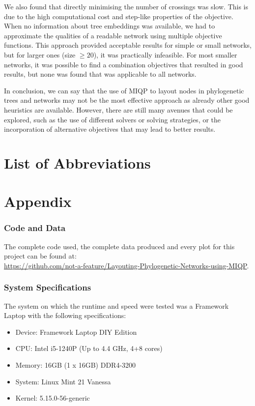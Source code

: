 \documentclass{article}
\begin{document}
We also found that directly minimising the number of crossings was slow. This is due to the high computational cost and step-like properties of the objective. When no information about tree embeddings was available, we had to approximate the qualities of a readable network using multiple objective functions. This approach provided acceptable results for simple or small networks, but for larger ones (size $\geq 20$), it was practically infeasible. For most smaller networks, it was possible to find a combination objectives that resulted in good results, but none was found that was applicable to all networks.

In conclusion, we can say that the use of \ac{MIQP} to layout nodes in phylogenetic trees and networks may not be the most effective approach as already other good heuristics are available. However, there are still many avenues that could be explored, such as the use of different solvers or solving strategies, or the incorporation of alternative objectives that may lead to better results.


\newpage
\section*{List of Abbreviations}
\begin{acronym}[MIQP-] %
\setlength{\parskip}{0ex}
\setlength{\itemsep}{0ex}
\end{acronym}

\section*{Appendix}
\subsubsection*{Code and Data}
The complete code used, the complete data produced and every plot for this project can be found at:\\\url{https://github.com/not-a-feature/Layouting-Phylogenetic-Networks-using-MIQP}.

\subsubsection*{System Specifications}
The system on which the runtime and speed were tested was a Framework Laptop with the following specifications:
\begin{itemize}
    \item Device: Framework Laptop DIY Edition
    \item CPU: Intel i5-1240P (Up to 4.4 GHz, 4+8 cores)
    \item Memory: 16GB (1 x 16GB) DDR4-3200
    \item System: Linux Mint 21 Vanessa 
    \item Kernel: 5.15.0-56-generic
\end{itemize}
\end{document}
